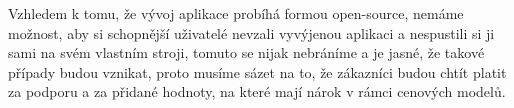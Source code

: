 \par Vzhledem k tomu, že vývoj aplikace probíhá formou open-source, nemáme možnost, aby si schopnější uživatelé nevzali vyvýjenou aplikaci a nespustili si ji sami na svém vlastním stroji, tomuto se nijak nebráníme a je jasné, že takové případy budou vznikat, proto musíme sázet na to, že zákazníci budou chtít platit za podporu a za přidané hodnoty, na které mají nárok v rámci cenových modelů.
